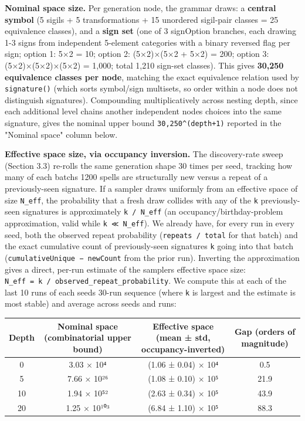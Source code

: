 \documentclass[
  10pt,
  twocolumn]{article}
\begin{document}
\textbf{Nominal space size.} Per generation node, the grammar draws: a
\textbf{central symbol} (5 sigils + 5 transformations + 15 unordered
sigil-pair classes = 25 equivalence classes), and a \textbf{sign set}
(one of 3 signOption branches, each drawing 1-3 signs from independent
5-element categories with a binary reversed flag per sign; option 1: 5×2
= 10; option 2: (5×2)×(5×2 + 5×2) = 200; option 3: (5×2)×(5×2)×(5×2) =
1,000; total 1,210 sign-set classes). This gives \textbf{30,250
equivalence classes per node}, matching the exact equivalence relation
used by \texttt{signature()} (which sorts symbol/sign multisets, so
order within a node does not distinguish signatures). Compounding
multiplicatively across nesting depth, since each additional level
chains another independent node\textquotesingle s choices into the same
signature, gives the nominal upper bound \texttt{30,250\^{}(depth+1)}
reported in the "Nominal space" column below.

\textbf{Effective space size, via occupancy inversion.} The
discovery-rate sweep (Section 3.3) re-rolls the same generation shape 30
times per seed, tracking how many of each batch\textquotesingle s 1200
spells are structurally new versus a repeat of a previously-seen
signature. If a sampler draws uniformly from an effective space of size
\texttt{N\_eff}, the probability that a fresh draw collides with any of
the \texttt{k} previously-seen signatures is approximately
\texttt{k\ /\ N\_eff} (an occupancy/birthday-problem approximation,
valid while \texttt{k\ ≪\ N\_eff}). We already have, for every run in
every seed, both the observed repeat probability
(\texttt{repeats\ /\ total} for that batch) and the exact cumulative
count of previously-seen signatures \texttt{k} going into that batch
(\texttt{cumulativeUnique\ −\ newCount} from the prior run). Inverting
the approximation gives a direct, per-run estimate of the
sampler\textquotesingle s effective space size:
\texttt{N\_eff\ =\ k\ /\ observed\_repeat\_probability}. We compute this
at each of the last 10 runs of each seed\textquotesingle s 30-run
sequence (where \texttt{k} is largest and the estimate is most stable)
and average across seeds and runs:

\begin{table}[t]
\centering
\begin{tabular}{@{}cccc@{}}
\toprule
Depth & Nominal space (combinatorial upper bound) & Effective space
(mean ± std, occupancy-inverted) & Gap (orders of magnitude) \\
\midrule
0 & 3.03 × 10⁴ & (1.06 ± 0.04) × 10⁴ & 0.5 \\
5 & 7.66 × 10²⁶ & (1.08 ± 0.10) × 10⁵ & 21.9 \\
10 & 1.94 × 10⁵² & (2.63 ± 0.34) × 10⁵ & 43.9 \\
20 & 1.25 × 10¹⁰³ & (6.84 ± 1.10) × 10⁵ & 88.3 \\
\bottomrule
\end{tabular}
\end{table}
\end{document}
